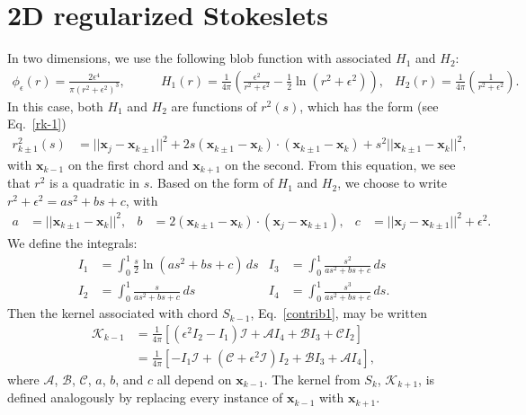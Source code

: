 \documentclass[12pt]{article}
\newcommand{\bx}{\mathbf{x}}
\newcommand{\phie}{\phi_{\epsilon}}
\newcommand{\eps}{\epsilon}
\newcommand{\baa}[1]{\begin{align} #1 \end{align}}
\newcommand{\baas}[1]{\begin{align*} #1 \end{align*}}
\begin{document}
	
	
	\section{2D regularized Stokeslets}
	
	In two dimensions, we use the following blob function with associated $H_1$ and $H_2$:
	\baas{
	\phie(r) = \frac{2\eps^4}{\pi(r^2 + \eps^2)^3}, & \qquad H_1(r) = \frac{1}{4\pi}\left(\frac{\eps^2}{r^2 + \eps^2} - \frac{1}{2}\ln \left( r^2 + \eps^2 \right)\right), &  H_2(r) = \frac{1}{4\pi}\left(\frac{1}{r^2 + \eps^2}\right).
	} 
	In this case, both $H_1$ and $H_2$ are functions of $r^2(s)$, which has the form (see Eq.~\eqref{rk-1})
	\baas{
	r^2_{k\pm 1}(s) & = || \bx_j - \bx_{k\pm 1} ||^2 + 2s(\bx_{k\pm 1} - \bx_k)\cdot(\bx_{k\pm 1} - \bx_k) + s^2 || \bx_{k\pm 1} - \bx_k ||^2,
	}
	with $\bx_{k-1}$ on the first chord and $\bx_{k+1}$ on the second. 
	From this equation, we see that $r^2$ is a quadratic in $s$. Based on the form of $H_1$ and $H_2$, we choose to write $r^2 + \eps^2 = as^2 + bs + c$, with
	\baa{
	a & = || \bx_{k\pm 1} - \bx_k ||^2, & b & =  2(\bx_{k\pm 1} - \bx_k ) \cdot (\bx_j - \bx_{k\pm 1} ), & c & = || \bx_j - \bx_{k\pm 1}||^2 + \eps^2. \label{coeffabc}
	}
	 We define the integrals: 
	\baas{
	I_1 & = \int_0^1 \frac{s}{2}\ln \left( as^2 + bs + c \right) \, ds & I_3 & = \int_0^1 \frac{s^2}{as^2 + bs + c} \, ds \\
	I_2 & = \int_0^1 \frac{s}{as^2 + bs + c} \, ds  & I_4 & = \int_0^1 \frac{s^3}{as^2 + bs + c} \, ds. 
	}
	Then the kernel associated with chord $S_{k-1}$, Eq.~\eqref{contrib1}, may be written
	\baa{
	\mathcal{K}_{k-1} &= \frac{1}{4\pi}\left[\left(\eps^2 I_2 - I_1\right)\mathcal{I} + \mathcal{A} I_4 + \mathcal{B} I_3 + \mathcal{C} I_2\right] \nonumber \\
	& =  \frac{1}{4\pi}\left[- I_1\mathcal{I} + \left(\mathcal{C} + \eps^2\mathcal{I}\right) I_2 + \mathcal{B} I_3 + \mathcal{A} I_4\right], \label{Kk-12D}
	}	
	where $\mathcal{A}$, $\mathcal{B}$, $\mathcal{C}$, $a$, $b$, and $c$ all depend on $\bx_{k-1}$. The kernel from $S_k$, $\mathcal{K}_{k+1}$, is defined analogously by replacing every instance of $\bx_{k-1}$ with $\bx_{k+1}$. 
\end{document}
